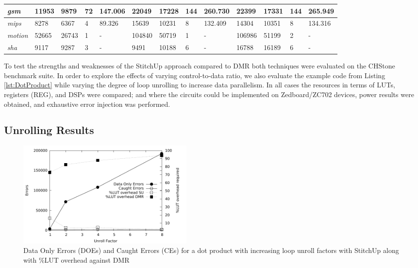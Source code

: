 \begin{table}[t]
\begin{tabular}{@{}|l|l|l|l|l|l|l|l|l|l|l|l|l|@{}}
\textit{gsm}        & 11953        & 9879         & 72           & 147.006        & 22049        & 17228        & 144          & 260.730        & 22399        & 17331        & 144          & 265.949        \\ \midrule
\textit{mips}       & 8278         & 6367         & 4            & 89.326         & 15639        & 10231        & 8            & 132.409        & 14304        & 10351        & 8            & 134.316        \\ \midrule
\textit{motion}     & 52665        & 26743        & 1            & -              & 104840       & 50719        & 1            & -              & 106986       & 51199        & 2            & -              \\ \midrule
\textit{sha}        & 9117         & 9287         & 3            & -              & 9491         & 10188        & 6            & -              & 16788        & 16189        & 6            & -               \\ \bottomrule
\end{tabular}
\end{table}

To test the strengths and weaknesses of the StitchUp approach compared to DMR both techniques were evaluated on the CHStone benchmark suite.
In order to explore the effects of varying control-to-data ratio, we also evaluate the example code from 
Listing \ref{lst:DotProduct} while varying the degree of loop unrolling to increase data parallelism.
In all cases the resources in terms of LUTs, registers (REG), and DSPs were compared; and where the circuits could be implemented
on Zedboard/ZC702 devices, power results were obtained, and exhaustive error injection was performed.

\subsection{Unrolling Results}
\begin{figure}[h]
\centering
\includegraphics[width=3.5in]{./graphs/dp_unrolling_res.pdf}
\caption{Data Only Errors (DOEs) and Caught Errors (CEs) for a dot product with increasing loop unroll factors with StitchUp along with \%LUT overhead against DMR}
\label{fig:dp_unrolling_res}
\end{figure}

